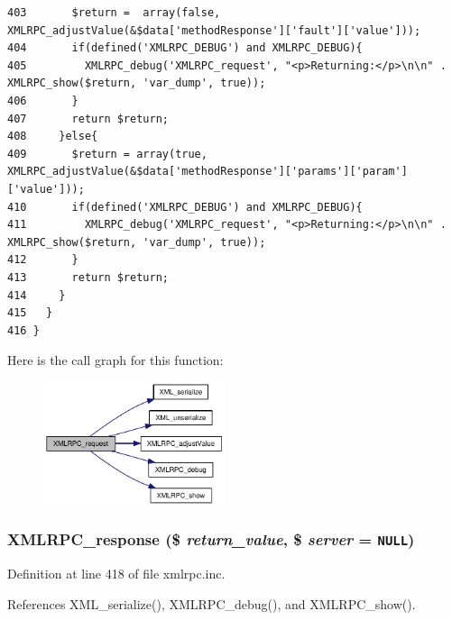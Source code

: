 \begin{Code}
\begin{verbatim}
403       $return =  array(false, XMLRPC_adjustValue(&$data['methodResponse']['fault']['value']));
404       if(defined('XMLRPC_DEBUG') and XMLRPC_DEBUG){
405         XMLRPC_debug('XMLRPC_request', "<p>Returning:</p>\n\n" . XMLRPC_show($return, 'var_dump', true));
406       }
407       return $return;
408     }else{
409       $return = array(true, XMLRPC_adjustValue(&$data['methodResponse']['params']['param']['value']));
410       if(defined('XMLRPC_DEBUG') and XMLRPC_DEBUG){
411         XMLRPC_debug('XMLRPC_request', "<p>Returning:</p>\n\n" . XMLRPC_show($return, 'var_dump', true));
412       }
413       return $return;
414     }
415   }
416 }
\end{verbatim}
\end{Code}




Here is the call graph for this function:\nopagebreak
\begin{figure}[H]
\begin{center}
\leavevmode
\includegraphics[width=151pt]{xmlrpc_8inc_3a98b6984b8ca01752d1aa9a267526a3_cgraph}
\end{center}
\end{figure}
\hypertarget{xmlrpc_8inc_c736d378caaccdd0726ea1080d1f526f}{
\subsubsection{\setlength{\rightskip}{0pt plus 5cm}XMLRPC\_\-response (\$ {\em return\_\-value}, \$ {\em server} = {\tt NULL})}}
\label{xmlrpc_8inc_c736d378caaccdd0726ea1080d1f526f}




Definition at line 418 of file xmlrpc.inc.

References XML\_\-serialize(), XMLRPC\_\-debug(), and XMLRPC\_\-show().


